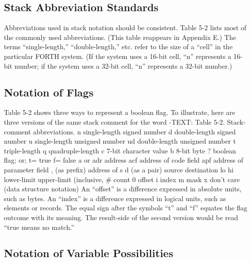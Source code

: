 \subsection{Stack Abbreviation Standards}

Abbreviations used in stack notation should be consistent.  Table 5-2 lists
most of the commonly used abbreviations.  (This table reappears in
Appendix E.) The terms ``single-length,'' ``double-length,'' etc. refer to
the size of a ``cell'' in the particular FORTH system.  (If the system uses a
16-bit cell, ``n'' represents a 16-bit number; if the system uses a 32-bit
cell, ``n'' represents a 32-bit number.)

\subsection{Notation of Flags}

Table 5-2 shows three ways to represent a boolean flag.  To illustrate, here
are three versions of the same stack comment for the word -TEXT:
Table 5-2. Stack-comment abbreviations.
n               single-length signed number
d               double-length signed number
u               single-length unsigned number
ud              double-length unsigned number
t               triple-length
q               quadruple-length
c               7-bit character value
b               8-bit byte
?               boolean flag; or;
   t=           true
   f=           false
a or adr        address
acf             address of code field
apf             address of parameter field
,               (as prefix) address of
s d             (as a pair) source destination
lo hi           lower-limit upper-limit (inclusive,
\#               count
0               offset
i               index
m               mask
x               don't care (data structure notation)
An ``offset'' is a difference expressed in absolute units, such as bytes.
An ``index'' is a difference expressed in logical units, such as elements or records.
The equal sign after the symbols ``t'' and ``f'' equates the flag outcome
with its meaning.  The result-side of the second version would be read
``true means no match.''


\subsection{Notation of Variable Possibilities}

